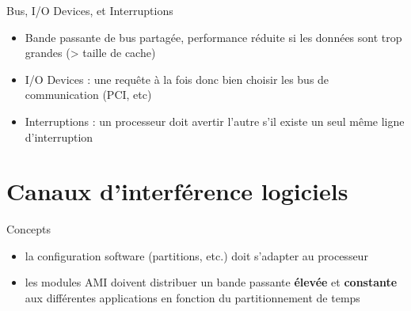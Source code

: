 \documentclass{beamer}
\begin{document}
\begin{frame}{Bus, I/O Devices, et Interruptions}
	\begin{itemize}
		\item Bande passante de bus partagée, performance réduite si les données sont trop
			grandes (> taille de cache)\pause
		\item I/O Devices : une requête à la fois donc bien choisir les bus de
			communication (PCI, etc)\pause
		\item Interruptions : un processeur doit avertir l'autre s'il existe un seul même
			ligne d'interruption
	\end{itemize}
\end{frame}

\section[CI logiciels]{Canaux d'interférence logiciels}

\begin{frame}{Concepts}
	\begin{itemize}
		\item la configuration software (partitions, etc.) doit s'adapter au processeur
		\item les modules AMI doivent distribuer un bande passante \textbf{élevée} et
			\textbf{constante} aux différentes applications en fonction du partitionnement
			de temps
	\end{itemize}
\end{frame}
\end{document}
